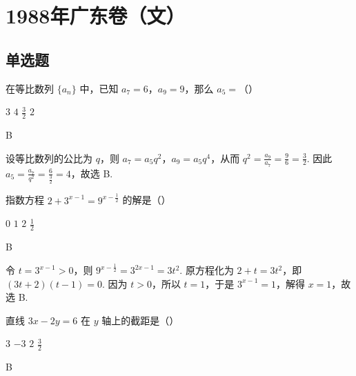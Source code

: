\documentclass[UTF8,a4paper,oneside,11pt]{ctexbook}
\begin{document}
\mainmatter

\chapter{1988年广东卷（文）}

\section{单选题}

\begin{problem}
在等比数列 \(\{a_n\}\) 中，已知 \(a_7 = 6\)，\(a_9 = 9\)，那么 \(a_5 =\)（\quad）

\choices
    {\(3\)}
    {\(4\)}
    {\(\frac{3}{2}\)}
    {\(2\)}
\end{problem}

\begin{answer}
B
\end{answer}

\begin{solution}
设等比数列的公比为 \(q\)，则 \(a_7=a_5q^2\)，\(a_9=a_5q^4\)，从而 \(q^2=\frac{a_9}{a_7}=\frac{9}{6}=\frac{3}{2}\). 因此 \(a_5=\frac{a_7}{q^2}=\frac{6}{\frac{3}{2}}=4\)，故选 B.
\end{solution}

\begin{problem}
指数方程 \(2 + 3^{x - 1} = 9^{x - \frac{1}{2}}\) 的解是（\quad）

\choices
    {\(0\)}
    {\(1\)}
    {\(2\)}
    {\(\frac{1}{2}\)}
\end{problem}

\begin{answer}
B
\end{answer}

\begin{solution}
令 \(t=3^{x-1}>0\)，则 \(9^{x-\frac{1}{2}}=3^{2x-1}=3t^2\). 原方程化为 \(2+t=3t^2\)，即 \((3t+2)(t-1)=0\). 因为 \(t>0\)，所以 \(t=1\)，于是 \(3^{x-1}=1\)，解得 \(x=1\)，故选 B.
\end{solution}

\begin{problem}
直线 \(3x - 2y = 6\) 在 \(y\) 轴上的截距是（\quad）

\choices
    {\(3\)}
    {\(-3\)}
    {\(2\)}
    {\(\frac{3}{2}\)}
\end{problem}

\begin{answer}
B
\end{answer}
\end{document}
